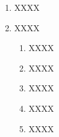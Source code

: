 \begin{enumerate}
  \item XXXX
  \item XXXX
    \begin{enumerate}
    \item XXXX
    \item XXXX
    \item XXXX
    \item XXXX
    \item XXXX
  \end{enumerate}

\end{enumerate}








